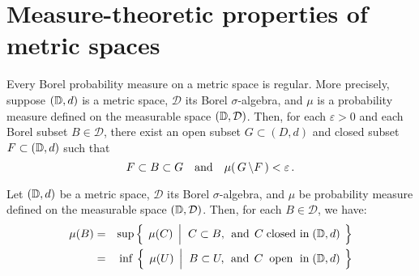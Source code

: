 

\section{Measure-theoretic properties of metric spaces}
\setcounter{theorem}{0}
\setcounter{equation}{0}


\renewcommand{\theenumi}{\roman{enumi}}
\renewcommand{\labelenumi}{\textnormal{(\theenumi)}$\;\;$}


\begin{theorem}
\mbox{}\vskip 0.1cm
\noindent
Every Borel probability measure on a metric space is regular.
More precisely, suppose $(\mathbb{D},d)$ is a metric space, $\mathcal{D}$ its Borel $\sigma$-algebra,
and $\mu$ is a probability measure defined on the measurable space $(\mathbb{D},\mathcal{D})$.
Then, for each $\varepsilon > 0$ and each Borel subset $B \in \mathcal{D}$, there exist
an open subset $G \subset (D,d)$ and closed subset $F \subset (\mathbb{D},d)$ such that
\begin{equation*}
F \subset B \subset G
\quad\textnormal{and}\quad
\mu\!\left(\,G \,\backslash F\,\right) < \varepsilon\,.
\end{equation*} 
\end{theorem}


\begin{corollary}
\mbox{}\vskip 0.1cm
\noindent
Let $(\mathbb{D},d)$ be a metric space, $\mathcal{D}$ its Borel $\sigma$-algebra, and
$\mu$ be probability measure defined on the measurable space $(\mathbb{D},\mathcal{D})$.
Then, for each $B \in \mathcal{D}$, we have:
\begin{eqnarray*}
\mu(B)
& = &
	\sup\left\{\;\,\mu(C)\;\left\vert\;\;
		C \overset{{\color{white}.}}{\subset} B,
		\;\,\textnormal{and}\;\,
		C \;\textnormal{closed in}\; (\D,d)
	\right.\;\right\}
\\
& = &
	\,\inf\,\left\{\;\,\mu(U)\;\left\vert\;\;
		B \overset{{\color{white}.}}{\subset} U,
		\;\,\textnormal{and}\;\,
		C \;\textnormal{\;open\; in}\; (\D,d)
	\right.\;\right\}
\end{eqnarray*} 
\end{corollary}

